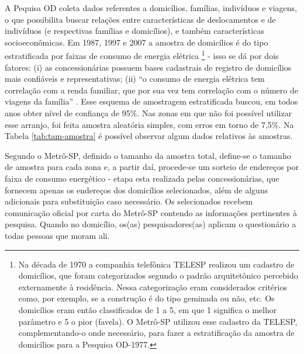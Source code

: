 A Pequisa OD coleta dados referentes a domicílios, famílias, indivíduos e viagens, o que possibilita buscar relações entre características de deslocamentos e de indivíduos (e respectivas famílias e domicílios), e também características socioeconômicas. Em 1987, 1997 e 2007 a amostra de domicílios é do tipo estratificada por faixas de consumo de energia elétrica%
\footnote{Na década de 1970 a companhia telefônica TELESP realizou um cadastro de domicílios, que foram categorizados segundo o padrão arquitetônico percebido externamente à residência. Nessa categorização eram considerados critérios como, por exemplo, se a construção é do tipo geminada ou não, etc. Os domicílios eram então classificados de 1 a 5, em que 1 significa o melhor parâmetro e 5 o pior (favela). O Metrô-SP utilizou esse cadastro da TELESP, complementando-o onde necessário, para fazer a estratificação da amostra de domicílios para a Pesquisa OD-1977.} - isso se dá por dois fatores: (i) as concessionárias possuem bases cadastrais de registro de domicílios mais confiáveis e representativas; (ii) ``o consumo de energia elétrica tem correlação com a renda familiar, que por sua vez tem correlação com o número de viagens da família'' \cite[p.10]{MANUALOD2007}. Esse esquema de amostragem estratificada buscou, em todos anos obter nível de confiança de 95\%. Nas zonas em que não foi possível utilizar esse arranjo, foi feita amostra aleatória simples, com erros em torno de 7,5\%. Na Tabela \ref{tab:tam-amostra} é possível observar algum dados relativos às amostras.

Segundo o Metrô-SP, definido o tamanho da amostra total, define-se o tamanho de amostra para cada zona e, a partir daí, procede-se um sorteio de endereços por faixa de consumo energético - etapa esta realizada pelas concessionárias, que fornecem apenas os endereços dos domicílios selecionados, além de alguns adicionais para substituição caso necessário. Os selecionados recebem comunicação oficial por carta do Metrô-SP contendo as informações pertinentes à pesquisa. Quando no domicílio, os(as) pesquisadores(as) aplicam o questionário a todas pessoas que moram ali.


